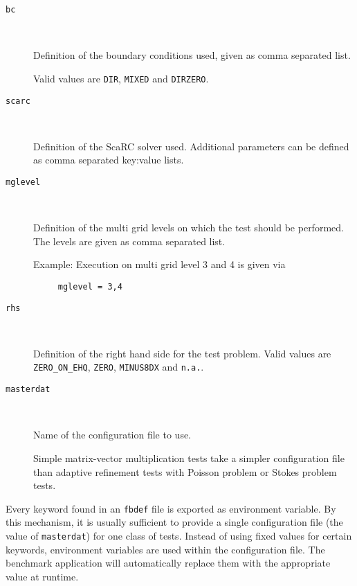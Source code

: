 \begin{description}
\item[\texttt{bc}]  \

  Definition of the boundary conditions used, given as comma separated list.

  Valid values are \texttt{DIR}, \texttt{MIXED} and \texttt{DIRZERO}.

\item[\texttt{scarc}]  \

  Definition of the  ScaRC solver used. Additional parameters can be defined as
  comma separated key:value lists.

\item[\texttt{mglevel}] \

  Definition of the multi grid levels on which the test should be performed. The levels are
  given as comma separated list.

  Example: Execution on multi grid level 3 and 4 is given via
  \begin{verbatim}
     mglevel = 3,4
  \end{verbatim}

\item[\texttt{rhs}]  \

  Definition of the right hand side for the test problem. Valid values are
  \texttt{ZERO\_ON\_EHQ}, \texttt{ZERO}, \texttt{MINUS8DX} and \texttt{n.a.}.

\item[\texttt{masterdat}]  \

  Name of the configuration file to use.

  Simple matrix-vector multiplication tests take a simpler configuration file
  than adaptive refinement tests with Poisson problem or Stokes problem tests.

\end{description}

Every keyword found in an \texttt{fbdef} file is exported as environment
variable. By this mechanism, it is usually sufficient to provide a single
configuration file (the value of \texttt{masterdat}) for one class of tests.
Instead of using fixed values for certain keywords, environment variables are
used within the configuration file. The benchmark application will automatically
replace them with the appropriate value at runtime.

